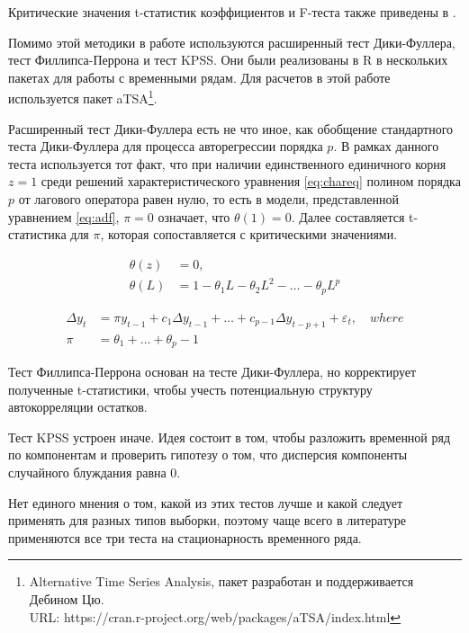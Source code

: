 \documentclass[a4paper,12pt]{article}
\begin{document}
Критические значения t-статистик коэффициентов и F-теста также приведены в \cite{Dickey1981}.

Помимо этой методики в работе используются расширенный тест Дики-Фуллера, тест Филлипса-Перрона и тест KPSS. Они были реализованы в R в нескольких пакетах для работы с временными рядам. Для расчетов в этой работе используется пакет aTSA\footnote{Alternative Time Series Analysis, пакет разработан и поддерживается Дебином Цю. \\URL: https://cran.r-project.org/web/packages/aTSA/index.html}.

Расширенный тест Дики-Фуллера есть не что иное, как обобщение стандартного теста Дики-Фуллера для процесса авторегрессии порядка $p$. В рамках данного теста используется тот факт, что при наличии единственного единичного корня $z=1$ среди решений характеристического уравнения \ref{eq:chareq} полином порядка $p$ от лагового оператора равен нулю, то есть в модели, представленной уравнением \ref{eq:adf}, $\pi=0$ означает, что $\theta(1)=0$. Далее составляется t-статистика для $\pi$, которая сопоставляется с критическими значениями.

\begin{align}
  \label{eq:chareq}
  \theta(z)&=0,\\
  \theta(L)&=1-\theta_1 L-\theta_2 L^2-\ldots-\theta_p L^p
\end{align}

\begin{align}
  \label{eq:adf}
  \Delta y_t&=\pi y_{t-1}+c_1\Delta y_{t-1}+\ldots+c_{p-1}\Delta y_{t-p+1}+\varepsilon_t,\quad where\\
  \pi&=\theta_1+\ldots+\theta_p-1
\end{align}

Тест Филлипса-Перрона основан на тесте Дики-Фуллера, но корректирует полученные t-статистики, чтобы учесть потенциальную структуру автокорреляции остатков.

Тест KPSS устроен иначе. Идея состоит в том, чтобы разложить временной ряд по компонентам и проверить гипотезу о том, что дисперсия компоненты случайного блуждания равна 0.

Нет единого мнения о том, какой из этих тестов лучше и какой следует применять для разных типов выборки, поэтому чаще всего в литературе применяются все три теста на стационарность временного ряда.

\newpage
\end{document}
